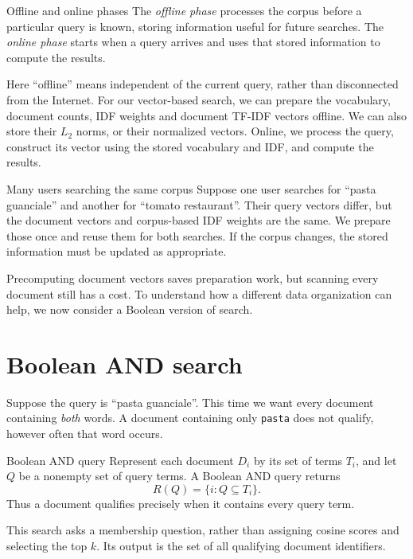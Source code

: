 \documentclass[a4paper,12pt,oneside]{report}
\begin{document}
\begin{frameddefn}{Offline and online phases}\label{def:offline-online}
The \emph{offline phase} processes the corpus before a particular query
is known, storing information useful for future searches. The
\emph{online phase} starts when a query arrives and uses that stored
information to compute the results.
\end{frameddefn}

Here ``offline'' means independent of the current query, rather than
disconnected from the Internet. For our vector-based search, we can
prepare the vocabulary, document counts, IDF weights and document
TF-IDF vectors offline. We can also store their $L_2$ norms, or their
normalized vectors. Online, we process the query, construct its vector
using the stored vocabulary and IDF, and compute the results.

\begin{framedexample}{Many users searching the same corpus}
Suppose one user searches for ``pasta guanciale'' and another for
``tomato restaurant''. Their query vectors differ, but the document
vectors and corpus-based IDF weights are the same. We prepare those
once and reuse them for both searches. If the corpus changes, the
stored information must be updated as appropriate.
\end{framedexample}

Precomputing document vectors saves preparation work, but scanning
every document still has a cost. To understand how a different data
organization can help, we now consider a Boolean version of search.

\section{Boolean AND search}

Suppose the query is ``pasta guanciale''. This time we want every
document containing \emph{both} words. A document containing only
\texttt{pasta} does not qualify, however often that word occurs.

\begin{frameddefn}{Boolean AND query}\label{def:boolean-and}
Represent each document $D_i$ by its set of terms $T_i$, and let $Q$
be a nonempty set of query terms. A Boolean AND query returns
\[
  R(Q)=\{i:Q\subseteq T_i\}.
\]
Thus a document qualifies precisely when it contains every query term.
\end{frameddefn}

This search asks a membership question, rather than assigning cosine
scores and selecting the top $k$. Its output is the set of all
qualifying document identifiers.
\end{document}
